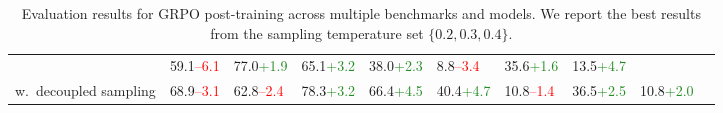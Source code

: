 \begin{table}[ht]
\begin{tabular}{lllllllllc}
                           & 59.1{\tiny\textcolor{red}{–6.1}}
                           & 77.0{\tiny\textcolor{ForestGreen}{+1.9}}
                           & 65.1{\tiny\textcolor{ForestGreen}{+3.2}}
                           & 38.0{\tiny\textcolor{ForestGreen}{+2.3}}
                           &  8.8{\tiny\textcolor{red}{–3.4}}
                           & 35.6{\tiny\textcolor{ForestGreen}{+1.6}}
                           & 13.5{\tiny\textcolor{ForestGreen}{+4.7}} \\
\quad w.\ decoupled sampling
                           & 68.9{\tiny\textcolor{red}{–3.1}}
                           & 62.8{\tiny\textcolor{red}{–2.4}}
                           & 78.3{\tiny\textcolor{ForestGreen}{+3.2}}
                           & 66.4{\tiny\textcolor{ForestGreen}{+4.5}}
                           & 40.4{\tiny\textcolor{ForestGreen}{+4.7}}
                           & 10.8{\tiny\textcolor{red}{–1.4}}
                           & 36.5{\tiny\textcolor{ForestGreen}{+2.5}}
                           & 10.8{\tiny\textcolor{ForestGreen}{+2.0}} \\
\bottomrule
\end{tabular}
\caption{Evaluation results for GRPO post-training across multiple benchmarks and models. We report the best results from the sampling temperature set $\{0.2,0.3,0.4\}$.}
\label{tab:grpo-results}
\end{table}
